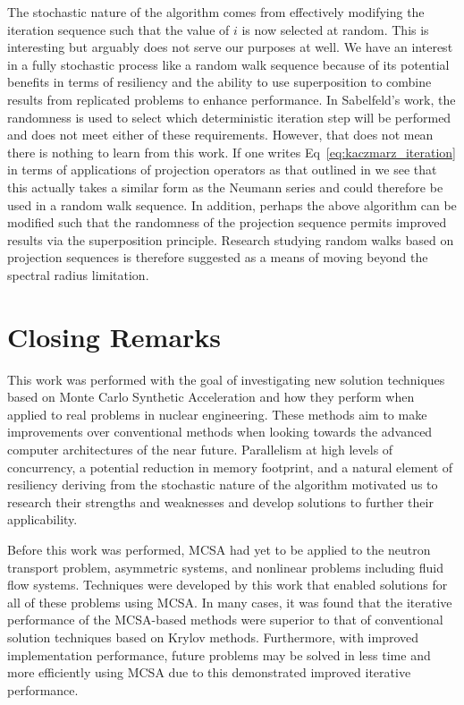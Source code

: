 The stochastic nature of the algorithm comes from effectively
modifying the iteration sequence such that the value of $i$ is now
selected at random. This is interesting but arguably does not serve
our purposes at well. We have an interest in a fully stochastic
process like a random walk sequence because of its potential benefits
in terms of resiliency and the ability to use superposition to combine
results from replicated problems to enhance performance. In
Sabelfeld's work, the randomness is used to select which deterministic
iteration step will be performed and does not meet either of these
requirements. However, that does not mean there is nothing to learn
from this work. If one writes Eq~\ref{eq:kaczmarz_iteration} in terms
of applications of projection operators as that outlined in
\cite{tanabe_projection_1971} we see that this actually takes a
similar form as the Neumann series and could therefore be used in a
random walk sequence. In addition, perhaps the above algorithm can be
modified such that the randomness of the projection sequence permits
improved results via the superposition principle. Research studying
random walks based on projection sequences is therefore suggested as a
means of moving beyond the spectral radius limitation.

\section{Closing Remarks\ }
\label{sec:closing}

This work was performed with the goal of investigating new solution
techniques based on Monte Carlo Synthetic Acceleration and how they
perform when applied to real problems in nuclear engineering. These
methods aim to make improvements over conventional methods when
looking towards the advanced computer architectures of the near
future. Parallelism at high levels of concurrency, a potential
reduction in memory footprint, and a natural element of resiliency
deriving from the stochastic nature of the algorithm motivated us to
research their strengths and weaknesses and develop solutions to
further their applicability.

Before this work was performed, MCSA had yet to be applied to the
neutron transport problem, asymmetric systems, and nonlinear problems
including fluid flow systems. Techniques were developed by this work
that enabled solutions for all of these problems using MCSA. In many
cases, it was found that the iterative performance of the MCSA-based
methods were superior to that of conventional solution techniques
based on Krylov methods. Furthermore, with improved implementation
performance, future problems may be solved in less time and more
efficiently using MCSA due to this demonstrated improved iterative
performance.


